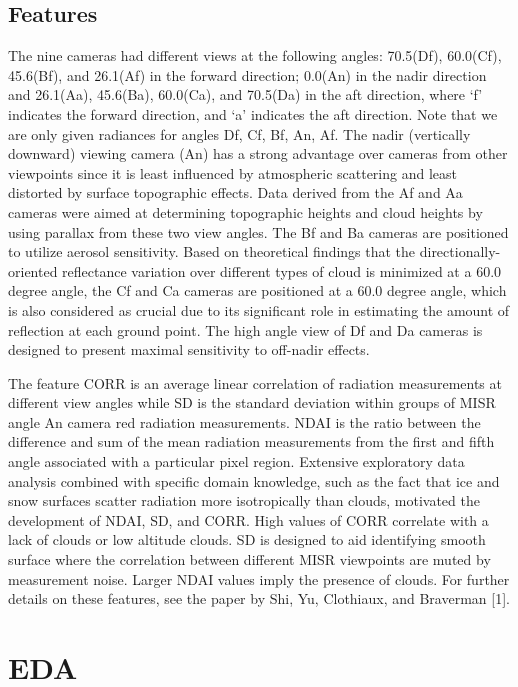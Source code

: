 \documentclass{article}\usepackage[]{graphicx}\usepackage[]{color}
\begin{document}
\subsection{Features} The nine cameras had different views at the following angles: 70.5\textdegree (Df), 60.0\textdegree (Cf), 45.6\textdegree (Bf), and 26.1\textdegree (Af) in the forward direction; 0.0\textdegree (An) in the nadir direction and 26.1\textdegree (Aa), 45.6\textdegree (Ba), 60.0\textdegree (Ca), and 70.5\textdegree (Da) in the aft direction, where `f' indicates the forward direction, and `a' indicates the aft direction. Note that we are only given radiances for angles Df, Cf, Bf, An, Af. The nadir (vertically downward) viewing camera (An) has a strong advantage over cameras from other viewpoints since it is least influenced by atmospheric scattering and least distorted by surface topographic effects. Data derived from the Af and Aa cameras were aimed at determining topographic heights and cloud heights by using parallax from these two view angles. The Bf and Ba cameras are positioned to utilize aerosol sensitivity. Based on theoretical findings that the directionally-oriented reflectance variation over different types of cloud is minimized at a 60.0 degree angle, the Cf and Ca cameras are positioned at a 60.0 degree angle, which is also considered as crucial due to its significant role in estimating the amount of reflection at each ground point. The high angle view of Df and Da cameras is designed to present maximal sensitivity to off-nadir effects. 

The feature CORR is an average linear correlation of radiation measurements at different view angles while SD is the standard deviation within groups of MISR angle An camera red radiation measurements. NDAI is the ratio between the difference and sum of the mean radiation measurements from the first and fifth angle associated with a particular pixel region. Extensive exploratory data analysis combined with specific domain knowledge, such as the fact that ice and snow surfaces scatter radiation more isotropically than clouds, motivated the development of NDAI, SD, and CORR. High values of CORR correlate with a lack of clouds or low altitude clouds. SD is designed to aid identifying smooth surface where the correlation between different MISR viewpoints are muted by measurement noise. Larger NDAI values imply the presence of clouds. For further details on these features, see the paper by Shi, Yu, Clothiaux, and Braverman [1].

\section{EDA}
\end{document}
